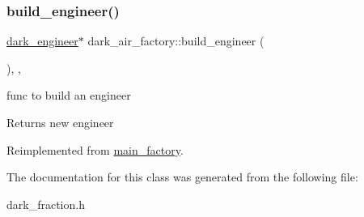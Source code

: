 \subsubsection{\texorpdfstring{build\+\_\+engineer()}{build\_engineer()}}
{\footnotesize\ttfamily \mbox{\hyperlink{classdark__engineer}{dark\+\_\+engineer}}$\ast$ dark\+\_\+air\+\_\+factory\+::build\+\_\+engineer (\begin{DoxyParamCaption}{ }\end{DoxyParamCaption})\hspace{0.3cm}{\ttfamily [inline]}, {\ttfamily [override]}, {\ttfamily [virtual]}}

func to build an engineer \begin{DoxyReturn}{Returns}
new engineer 
\end{DoxyReturn}


Reimplemented from \mbox{\hyperlink{classmain__factory_ac970fe346638331722123f2bb240b590}{main\+\_\+factory}}.



The documentation for this class was generated from the following file\+:\begin{DoxyCompactItemize}
\item 
dark\+\_\+fraction.\+h\end{DoxyCompactItemize}
